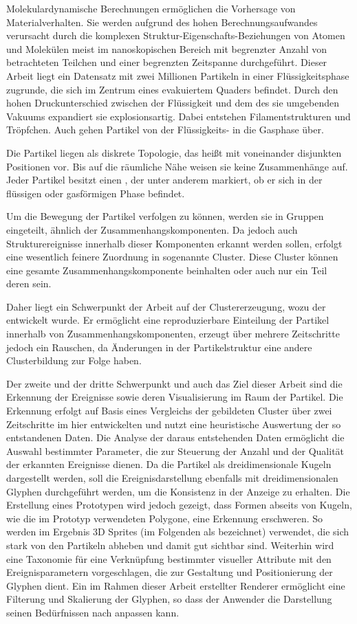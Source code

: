Molekulardynamische Berechnungen ermöglichen die Vorhersage von Materialverhalten. Sie werden aufgrund des hohen Berechnungsaufwandes verursacht durch die komplexen Struktur-Eigenschafts-Beziehungen von Atomen und Molekülen meist im nanoskopischen Bereich mit begrenzter Anzahl von betrachteten Teilchen und einer begrenzten Zeitspanne durchgeführt. Dieser Arbeit liegt ein Datensatz mit zwei Millionen Partikeln in einer Flüssigkeitsphase zugrunde, die sich im Zentrum eines evakuiertem Quaders befindet. Durch den hohen Druckunterschied zwischen der Flüssigkeit und dem des sie umgebenden Vakuums expandiert sie explosionsartig. Dabei entstehen Filamentstrukturen und Tröpfchen. Auch gehen Partikel von der Flüssigkeits- in die Gasphase über.

Die Partikel liegen als diskrete Topologie, das heißt mit voneinander disjunkten Positionen vor. Bis auf die räumliche Nähe weisen sie keine Zusammenhänge auf. Jeder Partikel besitzt einen , der unter anderem markiert, ob er sich in der flüssigen oder gasförmigen Phase befindet.

Um die Bewegung der Partikel verfolgen zu können, werden sie in Gruppen eingeteilt, ähnlich der Zusammenhangskomponenten. Da jedoch auch Strukturereignisse innerhalb dieser Komponenten erkannt werden sollen, erfolgt eine wesentlich feinere Zuordnung in sogenannte Cluster. Diese Cluster können eine gesamte Zusammenhangskomponente beinhalten oder auch nur ein Teil deren sein.

Daher liegt ein Schwerpunkt der Arbeit auf der Clustererzeugung, wozu der \CFD entwickelt wurde. Er ermöglicht eine reproduzierbare Einteilung der Partikel innerhalb von Zusammenhangskomponenten, erzeugt über mehrere Zeitschritte jedoch ein Rauschen, da Änderungen in der Partikelstruktur eine andere Clusterbildung zur Folge haben.

Der zweite und der dritte Schwerpunkt und auch das Ziel dieser Arbeit sind die Erkennung der Ereignisse sowie deren Visualisierung im Raum der Partikel. Die Erkennung erfolgt auf Basis eines Vergleichs der gebildeten Cluster über zwei Zeitschritte im hier entwickelten \SECC und nutzt eine heuristische Auswertung der so entstandenen Daten. Die Analyse der daraus entstehenden Daten ermöglicht die Auswahl bestimmter Parameter, die zur Steuerung der Anzahl und der Qualität der erkannten Ereignisse dienen.
Da die Partikel als dreidimensionale Kugeln dargestellt werden,
soll die Ereignisdarstellung ebenfalls mit dreidimensionalen Glyphen durchgeführt werden, um die Konsistenz in der Anzeige zu erhalten. Die Erstellung eines Prototypen wird jedoch gezeigt, dass Formen abseits von Kugeln, wie die im Prototyp verwendeten Polygone, eine Erkennung erschweren. So werden im Ergebnis 3D Sprites (im Folgenden als  bezeichnet) verwendet, die sich stark von den Partikeln abheben und damit gut sichtbar sind. Weiterhin wird eine Taxonomie für eine Verknüpfung bestimmter visueller Attribute mit den Ereignisparametern vorgeschlagen, die zur Gestaltung und Positionierung der Glyphen dient. Ein im Rahmen dieser Arbeit erstellter Renderer ermöglicht eine Filterung und Skalierung der Glyphen, so dass der Anwender die Darstellung seinen Bedürfnissen nach anpassen kann.

